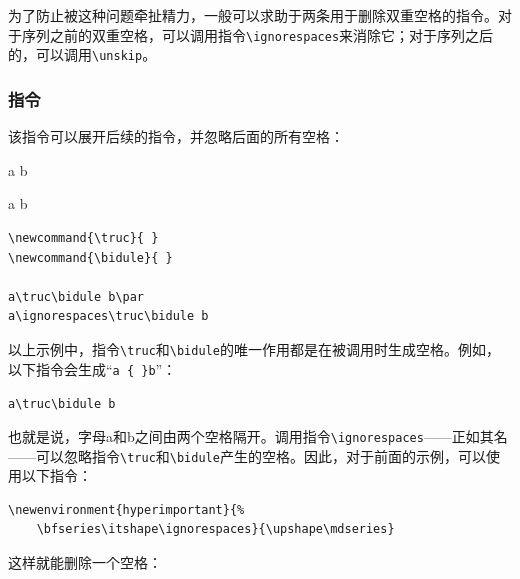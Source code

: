 为了防止被这种问题牵扯精力，一般可以求助于两条用于删除双重空格的指令。对于序列之前的双重空格，可以调用指令\verb+\ignorespaces+来消除它；对于序列之后的，可以调用\verb|\unskip|。

\subsubsection{指令}

该指令可以展开后续的指令，并忽略后面的所有空格：

\begin{codelist}[9.5]{
\newcommand{\truc}{ }
\newcommand{\bidule}{ }

a\truc\bidule b\par
a\ignorespaces\truc\bidule b
}
\begin{verbatim}
\newcommand{\truc}{ }
\newcommand{\bidule}{ }

a\truc\bidule b\par
a\ignorespaces\truc\bidule b\end{verbatim}
\end{codelist}

以上示例中，指令\verb|\truc|和\verb|\bidule|的唯一作用都是在被调用时生成空格。例如，以下指令会生成“\verb*|a { }b|”：

\begin{dmd}
\verb|a\truc\bidule b|
\end{dmd}

也就是说，字母a和b之间由两个空格隔开。调用指令\verb|\ignorespaces|——正如其名——可以忽略指令\verb|\truc|和\verb|\bidule|产生的空格。因此，对于前面的示例，可以使用以下指令：

\begin{dmd}
\begin{verbatim}
\newenvironment{hyperimportant}{% 
    \bfseries\itshape\ignorespaces}{\upshape\mdseries}\end{verbatim}
\end{dmd}

这样就能删除一个空格：

\renewenvironment{hyperimportant}{%
    \bfseries\itshape\ignorespaces}{\upshape\mdseries}


